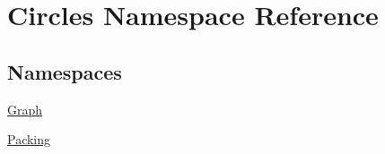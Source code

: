 \hypertarget{namespace_circles}{}\section{Circles Namespace Reference}
\label{namespace_circles}
\subsection*{Namespaces}
\begin{DoxyCompactItemize}
\item 
 \hyperlink{namespace_circles_1_1_graph}{Graph}
\item 
 \hyperlink{namespace_circles_1_1_packing}{Packing}
\end{DoxyCompactItemize}
